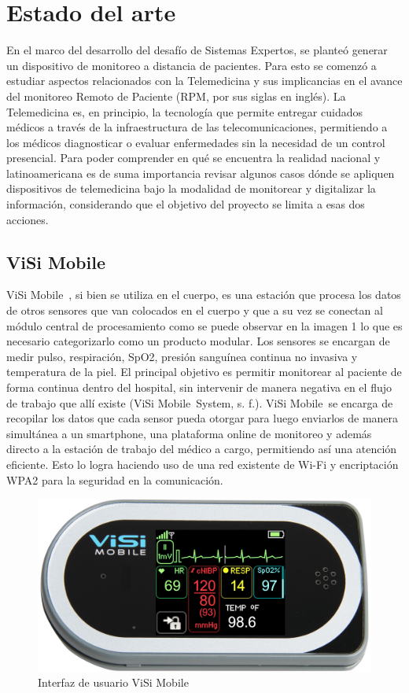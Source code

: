 \chapter{Estado del arte}\label{arte}
En el marco del desarrollo del desafío de Sistemas Expertos, se planteó generar un dispositivo de monitoreo a distancia de pacientes. Para esto se comenzó a estudiar aspectos relacionados con la Telemedicina y sus implicancias en el avance del monitoreo Remoto de Paciente (RPM, por sus siglas en inglés). La Telemedicina es, en principio, la tecnología que permite entregar cuidados médicos a través de la infraestructura de las telecomunicaciones, permitiendo a los médicos diagnosticar o evaluar enfermedades sin la necesidad de un control presencial.
Para poder comprender en qué se encuentra la realidad nacional y latinoamericana es de suma importancia revisar algunos casos dónde se apliquen dispositivos de telemedicina bajo la modalidad de monitorear y digitalizar la información, considerando que el objetivo del proyecto se limita a esas dos acciones.

\section{ViSi Mobile\textregistered}
ViSi Mobile\textregistered\ \cite{visi}, si bien se utiliza en el cuerpo, es una estación que procesa los datos de otros sensores que van colocados en el cuerpo y que a su vez se conectan al módulo central de procesamiento como se puede observar en la imagen 1 lo que es necesario categorizarlo como un producto modular. Los sensores se encargan de medir pulso, respiración, SpO2, presión sanguínea continua no invasiva y temperatura de la piel. El principal objetivo es permitir monitorear al paciente de forma continua dentro del hospital, sin intervenir de manera negativa en el flujo de trabajo que allí existe (ViSi Mobile\textregistered\ System, s. f.). ViSi Mobile\textregistered\ se encarga de recopilar los datos que cada sensor pueda otorgar para luego enviarlos de manera simultánea a un smartphone, una plataforma online de monitoreo y además directo a la estación de trabajo del médico a cargo, permitiendo así una atención eficiente. Esto lo logra haciendo uso de una red existente de Wi-Fi y encriptación WPA2 para la seguridad en la comunicación\cite{visi_tel}.

\begin{figure}[H]
	\centering
	\includegraphics[scale=0.3]{figuras/estadoarte/visi/visi.jpg}
	\caption{Interfaz de usuario ViSi Mobile\textregistered}
	\label{visi1}
\end{figure}

